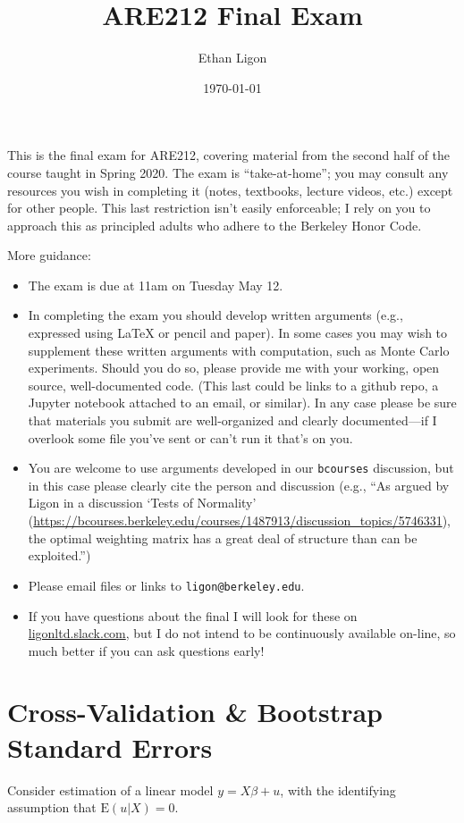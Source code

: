 \documentclass[12pt]{amsart}
\author{Ethan Ligon}
\date{\today}
\title{ARE212 Final Exam}
\newcommand{\E}{\ensuremath{\mbox{E}}}
\begin{document}
\maketitle

This is the final exam for ARE212, covering material from the second
half of the course taught in Spring 2020.   The exam is
``take-at-home''; you may consult any resources you wish in completing
it (notes, textbooks, lecture videos, etc.) except for other
people.  This last restriction isn't easily enforceable; I rely on
you to approach this as principled adults who adhere to the
Berkeley Honor Code.

More guidance:
\begin{itemize}
\item The exam is due at 11am  on Tuesday May 12.
\item In completing the exam you should develop written arguments
(e.g., expressed using \LaTeX{} or pencil and paper).  In some cases
you may wish to supplement these written arguments with
computation, such as Monte Carlo experiments.  Should you do so,
please provide me with your working, open source, well-documented code.  (This
last could be links to a github repo, a Jupyter notebook attached
to an email, or similar).  In any case please be sure that
materials you submit are well-organized and clearly
documented---if I overlook some file you've sent or can't run it
that's on you.
\item You are welcome to use arguments developed in our \texttt{bcourses}
discussion, but in this case please clearly cite the person and
discussion (e.g., ``As argued by Ligon in a discussion `Tests of
Normality'
(\url{https://bcourses.berkeley.edu/courses/1487913/discussion\_topics/5746331}),
the optimal weighting matrix has a great deal of structure than
can be exploited.'')
\item Please email files or links to \texttt{ligon@berkeley.edu}.
\item If you have questions about the final I will look for these on
\href{https://ligonltd.slack.com}{ligonltd.slack.com}, but I do not intend to be continuously
available on-line, so much better if you can ask questions early!
\end{itemize}

\section{Cross-Validation \& Bootstrap Standard Errors}
\label{sec:org3097219}
Consider estimation of a linear model \(y = X\beta + u\), with the
identifying assumption that \(\E(u|X)=0\).  
\end{document}
